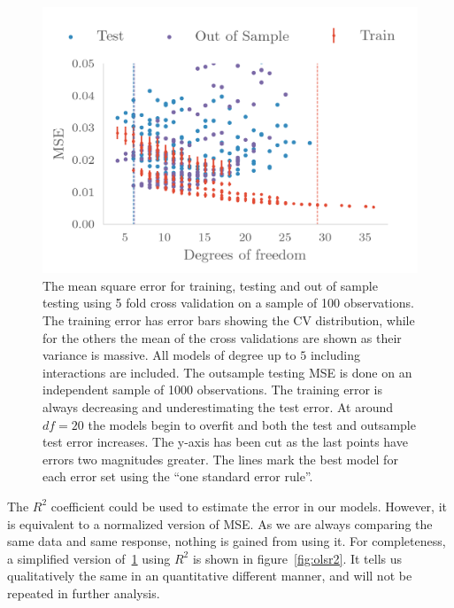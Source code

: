 \begin{figure}
  \centering
  \includegraphics[]{figures/olsmse.png}
  \caption{\label{fig:olsmse} The mean square error for training, testing and
    out of sample testing using 5 fold cross validation on a sample of 100
    observations. The training error has error bars showing the CV
    distribution, while for the others the mean of the cross
    validations are shown as their variance is massive. All models of degree up to \(5\) including interactions
    are included. The outsample testing MSE is done on an independent sample of
    1000 observations. The training error is always decreasing and
    underestimating the test error. At around \(df = 20\) the models begin to
    overfit and both the test and outsample test error increases. The y-axis has
  been cut as the last points have errors two magnitudes greater. The lines mark
the best model for each error set using the ``one standard error rule''. }
\end{figure}

The \(R^{2}\) coefficient could be used to estimate the error in
our models. However, it is equivalent to a normalized version of MSE. As we are
always comparing the same data and same response, nothing is gained from using it.
For completeness, a simplified version of~\cref{fig:olsmse} using \(R^{2}\) is
shown in figure~\cref{fig:olsr2}. It tells us qualitatively the same in an
quantitative different manner, and will not be repeated in further analysis.

